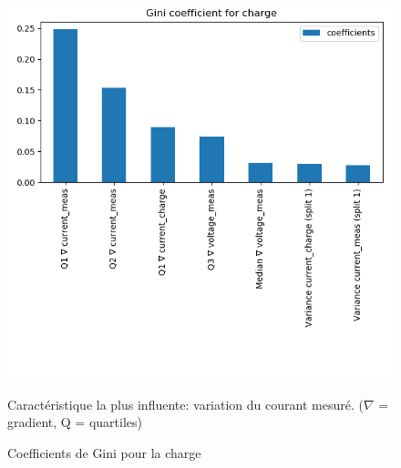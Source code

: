 \begin{figure}[h!]
    \centering
    \includegraphics[scale=0.6]{images/rf/gini_charge.png}
    \caption{Coefficients de Gini pour la charge}
    \label{fig:GiniCharge}
    \begin{center}
    Caractéristique la plus influente: variation du courant mesuré.  ($\nabla$ = gradient, Q = quartiles)
    \end{center}
\end{figure}

